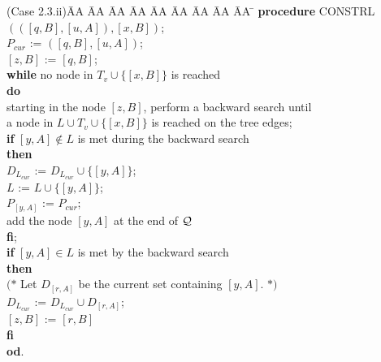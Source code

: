 \documentclass[12pt,twoside,a4paper]{article}
\begin{document}
\begin{tabbing}
(Case 2.3.ii)\= AA \= AA \= AA \= AA \= AA \= AA \= AA \= AA \= AA \= \kill
\> {\bf procedure} CONSTRL$(([q,B],[u,A]),[x,B])$; \\
\> $P_{cur}$ := $([q,B],[u,A])$; \\
\> $[z,B]$ := $[q,B]$; \\
\> {\bf while} no node in $T_v \cup \{[x,B]\}$ is reached \\
\> {\bf do} \\
\> \> starting in the node $[z,B]$, perform a backward search until \\ 
\> \> a node in $L \cup T_v \cup \{[x,B]\}$ is reached on the tree edges; \\
\> \> {\bf if} $[y,A] \not\in L$ is met during the backward search \\ 
\> \> {\bf then} \\
\> \> \> $D_{L_{cur}}$ := $D_{L_{cur}} \cup \{[y,A]\}$; \\
\> \> \> $L$ := $L \cup \{[y,A]\}$; \\
\> \> \> $P_{[y,A]}$ := $P_{cur}$; \\
\> \> \> add the node $[y,A]$ at the end of $\cal{Q}$ \\
\> \> {\bf fi}; \\
\> \> {\bf if} $[y,A] \in L$ is met by the backward search \\
\> \> {\bf then} \\
\> \> \> $(\ast$ Let $D_{[r,A]}$ be the current set containing $[y,A]$. $\ast)$\\
\> \> \> $D_{L_{cur}}$ := $D_{L_{cur}} \cup D_{[r,A]}$; \\
\> \> \> $[z,B]$ := $[r,B]$ \\
\> \> {\bf fi} \\
\> {\bf od}. \\
\end{tabbing}
\end{document}
